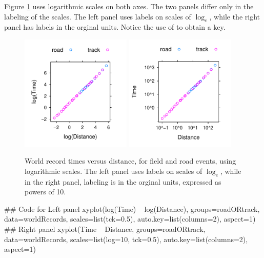 Figure \ref{fig:wrlog} uses logarithmic scales on both axes.  The two
panels differ only in the labeling of the scales.  The left panel uses
labels on scales of $\log_e$, while the right panel has labels in the
orginal units.  Notice the use of
 to obtain a key.

\begin{figure}
\begin{Schunk}


\centerline{\includegraphics[width=0.47\textwidth]{figs/05-wrTimesAB-1} \includegraphics[width=0.47\textwidth]{figs/05-wrTimesAB-2} }

\end{Schunk}
\caption{World record times versus distance, for field and road
  events, using logarithmic scales.  The left panel uses labels on
  scales of $\log_e$, while in the right panel, labeling is in the
  orginal units, expressed as powers of 10.}
\label{fig:wrlog}
\end{figure}

\begin{Schunk}
\begin{Sinput}
## Code for Left panel
xyplot(log(Time) ~ log(Distance),
       groups=roadORtrack, data=worldRecords,
       scales=list(tck=0.5),
       auto.key=list(columns=2), aspect=1)
## Right panel
xyplot(Time ~ Distance, groups=roadORtrack,
       data=worldRecords,
       scales=list(log=10, tck=0.5),
       auto.key=list(columns=2), aspect=1)
\end{Sinput}
\end{Schunk}
\vspace*{-9pt}

